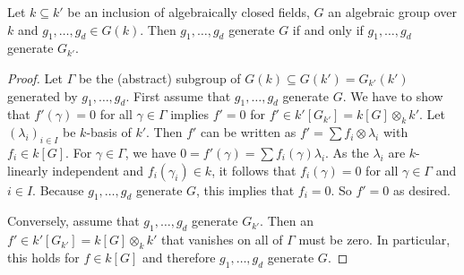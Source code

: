 \documentclass[a4paper, 11pt]{article}
\begin{document}
\begin{lemma}\label{lem:groupgen} Let $k \subseteq k'$ be an inclusion of algebraically closed fields, $G$ an algebraic group over $k$ and $g_1,\ldots,g_d\in G(k)$. Then 
	$g_1,\ldots,g_d$ generate $G$ if and only if $g_1,\ldots,g_d$ generate $G_{k'}$.
\end{lemma}
\begin{proof}
	Let $\Gamma$ be the (abstract) subgroup of $G(k)\subseteq G(k')=G_{k'}(k')$ generated by $g_1,\ldots,g_d$.
	First assume that $g_1,\ldots,g_d$ generate $G$. We have to show that $f'(\gamma)=0$ for all $\gamma\in\Gamma$ implies $f'=0$ for $f'\in k'[G_{k'}]=k[G]\otimes_k k'$. Let $(\lambda_i)_{i\in I}$ be $k$-basis of $k'$. Then $f'$ can be written as $f'=\sum f_i\otimes\lambda_i$ with $f_i\in k[G]$. For $\gamma\in \Gamma$, we have $0=f'(\gamma)=\sum f_i(\gamma)\lambda_i$. As the $\lambda_i$ are $k$-linearly independent and $f_i(\gamma_i)\in k$, it follows that $f_i(\gamma)=0$ for all $\gamma\in\Gamma$ and $i\in I$. Because $g_1,\ldots,g_d$ generate $G$, this implies that $f_i=0$. So $f'=0$ as desired.
	
	Conversely, assume that $g_1,\ldots,g_d$ generate $G_{k'}$. Then an $f'\in k'[G_{k'}]=k[G]\otimes_k k'$ that vanishes on all of $\Gamma$ must be zero. In particular, this holds for $f\in k[G]$ and therefore $g_1,\ldots,g_d$ generate $G$.
\end{proof}
%
\end{document}
